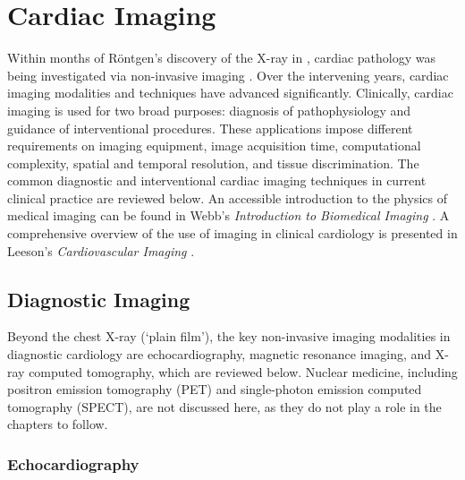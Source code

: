 \section{Cardiac Imaging}\label{app:imaging}

Within months of Röntgen's discovery of the X-ray in \cite{gagliardi_rontgen_1996}, cardiac pathology was being investigated via non-invasive imaging \cite{gagliardi_cardiac_1996}.  Over the intervening years, cardiac imaging modalities and techniques have advanced significantly.  Clinically, cardiac imaging is used for two broad purposes: diagnosis of pathophysiology and guidance of interventional procedures.  These applications impose different requirements on imaging equipment, image acquisition time, computational complexity, spatial and temporal resolution, and tissue discrimination.  The common diagnostic and interventional cardiac imaging techniques in current clinical practice are reviewed below.  An accessible introduction to the physics of medical imaging can be found in Webb's \textit{Introduction to Biomedical Imaging} \cite{webb_introduction_2002}.  A comprehensive overview of the use of imaging in clinical cardiology is presented in Leeson's \textit{Cardiovascular Imaging} \cite{leeson_cardiovascular_2011}.

\subsection{Diagnostic Imaging}
\label{sub:diagnostic}

Beyond the chest X-ray (`plain film'), the key non-invasive imaging modalities in diagnostic cardiology are echocardiography, magnetic resonance imaging, and X-ray computed tomography, which are reviewed below.  Nuclear medicine, including positron emission tomography (PET) and single-photon emission computed tomography (SPECT), are not discussed here, as they do not play a role in the chapters to follow.

\subsubsection{Echocardiography}

